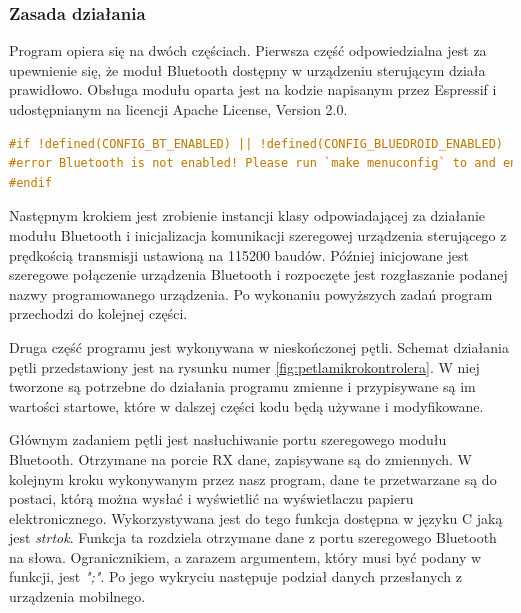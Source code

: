 \documentclass[a4paper,12pt, twoside]{article}
\begin{document}
    	\subsubsection{Zasada działania}

        Program opiera się na dwóch częściach. Pierwsza część odpowiedzialna jest za upewnienie się, że moduł Bluetooth dostępny w urządzeniu sterującym działa prawidłowo. Obsługa modułu oparta jest na kodzie napisanym przez Espressif i udostępnianym na licencji Apache License, Version 2.0.

    \begin{lstlisting}[language=C++, caption=Sprawdzenie poprawności działania Bluetooth]
#if !defined(CONFIG_BT_ENABLED) || !defined(CONFIG_BLUEDROID_ENABLED)
#error Bluetooth is not enabled! Please run `make menuconfig` to and enable it
#endif\end{lstlisting}
    
    	Następnym krokiem jest zrobienie instancji klasy odpowiadającej za działanie modułu Bluetooth i inicjalizacja komunikacji szeregowej urządzenia sterującego z prędkością transmisji ustawioną na 115200 baudów\cite{baud}. Później inicjowane jest szeregowe połączenie urządzenia Bluetooth i rozpoczęte jest rozgłaszanie podanej nazwy programowanego urządzenia. Po wykonaniu powyższych zadań program przechodzi do kolejnej części.
    	
    	Druga część programu jest wykonywana w nieskończonej pętli. Schemat działania pętli przedstawiony jest na rysunku numer \ref{fig:petlamikrokontrolera}. W niej tworzone są potrzebne do działania programu zmienne i przypisywane są im wartości startowe, które w dalszej części kodu będą używane i modyfikowane. 
    	
    	Głównym zadaniem pętli jest nasłuchiwanie portu szeregowego modułu Bluetooth. Otrzymane na porcie RX dane, zapisywane są do zmiennych. W kolejnym kroku wykonywanym przez nasz program, dane te przetwarzane są do postaci, którą można wysłać i wyświetlić na wyświetlaczu papieru elektronicznego. Wykorzystywana jest do tego funkcja dostępna w języku C jaką jest \textit{strtok}\cite{strtok}. Funkcja ta rozdziela otrzymane dane z portu szeregowego Bluetooth na słowa. \label{petladekod}Ogranicznikiem, a zarazem argumentem, który musi być podany w funkcji, jest \textit{";"}. Po jego wykryciu następuje podział danych przesłanych z urządzenia mobilnego.
    	
\end{document}
